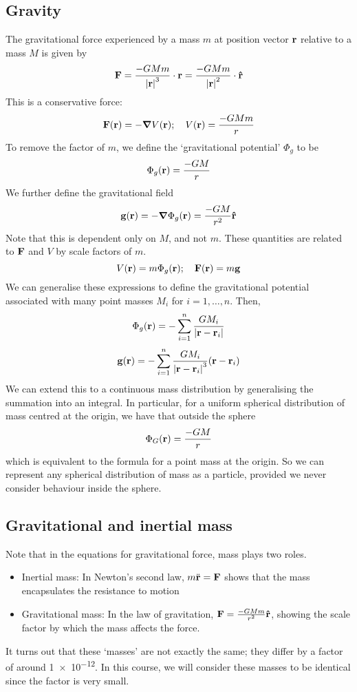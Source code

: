 \subsection{Gravity}
The gravitational force experienced by a mass \(m\) at position vector \(\vb r\) relative to a mass \(M\) is given by
\[
	\vb F = \frac{- G M m}{\abs{\vb r}^3} \cdot \vb r = \frac{- G M m}{\abs{\vb r}^2} \cdot \vu{r}
\]
This is a conservative force:
\[
	\vb F(\vb r) = -\grad V(\vb r);\quad V(\vb r) = \frac{-GMm}{r}
\]
To remove the factor of \(m\), we define the `gravitational potential' \(\Phi_g\) to be
\[
	\Phi_g(\vb r) = \frac{-GM}{r}
\]
We further define the gravitational field
\[
	\vb g(\vb r) = -\grad \Phi_g(\vb r) = \frac{-GM}{r^2}\vu{r}
\]
Note that this is dependent only on \(M\), and not \(m\).
These quantities are related to \(\vb F\) and \(V\) by scale factors of \(m\).
\[
	V(\vb r) = m \Phi_g(\vb r);\quad \vb F(\vb r) = m\vb g
\]
We can generalise these expressions to define the gravitational potential associated with many point masses \(M_i\) for \(i = 1, \dots, n\).
Then,
\[
	\Phi_g(\vb r) = -\sum_{i=1}^n \frac{GM_i}{\abs{\vb r - \vb r_i}}
\]
\[
	\vb g(\vb r) = -\sum_{i=1}^n \frac{GM_i}{\abs{\vb r - \vb r_i}^3}(\vb r - \vb r_i)
\]
We can extend this to a continuous mass distribution by generalising the summation into an integral.
In particular, for a uniform spherical distribution of mass centred at the origin, we have that outside the sphere
\[
	\Phi_G(\vb r) = \frac{-GM}{r}
\]
which is equivalent to the formula for a point mass at the origin.
So we can represent any spherical distribution of mass as a particle, provided we never consider behaviour inside the sphere.

\subsection{Gravitational and inertial mass}
Note that in the equations for gravitational force, mass plays two roles.
\begin{itemize}
	\item Inertial mass: In Newton's second law, \(m \ddot{\vb r} = \vb F\) shows that the mass encapsulates the resistance to motion
	\item Gravitational mass: In the law of gravitation, \(\vb F = \frac{-GMm}{r^2}\vu{r}\), showing the scale factor by which the mass affects the force.
\end{itemize}
It turns out that these `masses' are not exactly the same; they differ by a factor of around \num{1e-12}.
In this course, we will consider these masses to be identical since the factor is very small.

